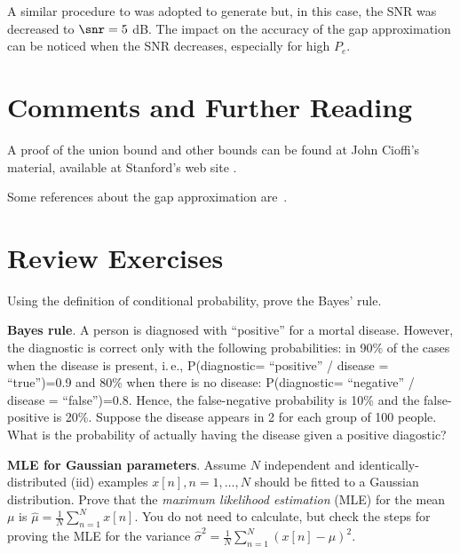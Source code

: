 A similar procedure to  was adopted to generate  but, in this case, the SNR was decreased to $\snr = 5$ dB. The impact on the accuracy of the gap approximation can be noticed when the SNR decreases, especially for high $P_e$.



\section{Comments and Further Reading}

A proof of the union bound and other bounds can be found at John Cioffi's material, available at Stanford's web site .

Some references about the gap approximation are~\cite{Forney91,Garcya-Armada06}.

\section{Review Exercises}

\begin{exercises}
\item Using the definition of conditional probability, prove the Bayes' rule.

\item \textbf{Bayes rule}.
A person is diagnosed with ``positive'' for a mortal disease.
However, the diagnostic is correct only with the following probabilities: in 90\% of the cases when the disease is present, i.\,e.,
P(diagnostic= ``positive'' / disease = ``true'')=0.9 and 80\% when there is no disease: 
P(diagnostic= ``negative'' / disease = ``false'')=0.8. Hence, the false-negative probability is 10\% and the false-positive is 20\%. Suppose the disease appears in 2 for each group of 100 people. What is the probability of actually having the disease given a positive diagostic?

\item \textbf{MLE for Gaussian parameters}. Assume $N$ independent and identically-distributed (iid) examples $x[n],n=1,\ldots,N$ should be fitted to a Gaussian distribution. Prove that the \emph{maximum likelihood estimation} (MLE) for the mean $\mu$ is 
$\hat\mu = \frac{1}{N}\sum_{n=1}^{N}x[n]$.
You do not need to calculate, but check the steps for proving the MLE for the variance
$
\hat\sigma^2 = \frac{1}{N}\sum_{n=1}^{N}(x[n] - \mu)^2.
$

\end{exercises}

